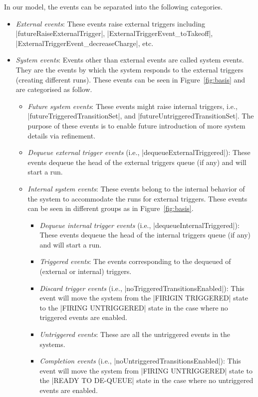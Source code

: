 In our \EventB model, the events can be separated into the following
categories.
\begin{itemize}
\item \emph{External events}: These events raise external triggers
  including |futureRaiseExternalTrigger|, |ExternalTriggerEvent_toTakeoff|,
  |ExternalTriggerEvent_decreaseCharge|, etc.
  
\item \emph{System events}: Events other than external events are
  called system events. They are the events by which the system responds to
  the external triggers (creating different runs).  These events can be
  seen in Figure~\ref{fig:basis} and are categorised as follow.
  \begin{itemize}
  \item \emph{Future system events}: These events might raise internal
    triggers, i.e., |futureTriggeredTransitionSet|, and
    |futureUntriggeredTransitionSet|.  The purpose of these events is
    to enable future introduction of more system details via refinement.
    
  \item \emph{Dequeue external trigger events} (i.e.,
    |dequeueExternalTriggered|): These events dequeue the head of the
    external triggers queue (if any) and will start a run.

  \item \emph{Internal system events}: These events belong to the
    internal behavior of the system to accommodate the runs for external
    triggers.  These events can be seen in different groups as in
    Figure~\ref{fig:basis}.
    \begin{itemize}
    \item \emph{Dequeue internal trigger events} (i.e.,
      |dequeueInternalTriggered|): These events dequeue the head of the
      internal triggers queue (if any) and will start a run.
    
    \item \emph{Triggered events}: The events corresponding to the
      dequeued of (external or internal) triggers.

    \item \emph{Discard trigger events} (i.e.,
      |noTriggeredTransitionsEnabled|):  This event will move the system
      from the |FIRIGIN TRIGGERED| state to the |FIRING UNTRIGGERED| state 
      in the case where no triggered events are enabled.
    
    \item \emph{Untriggered events}:  These are all the untriggered 
    events in the systems.

    \item \emph{Completion events} (i.e.,
      |noUntriggeredTransitionsEnabled|): This event will move the
      system from |FIRING UNTRIGGERED| state to the |READY TO DE-QUEUE|
      state in the case where no untriggered events are
      enabled.
    \end{itemize}
  \end{itemize}
\end{itemize}

